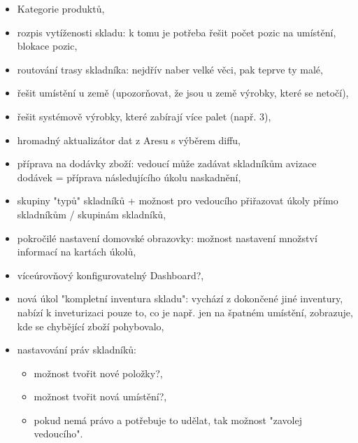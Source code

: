 \begin{itemize}
	\item Kategorie produktů,
	\item rozpis vytíženosti skladu: k tomu je potřeba řešit počet pozic na umístění, blokace pozic,
	\item routování trasy skladníka: nejdřív naber velké věci, pak teprve ty malé,
	\item řešit umístění u země (upozorňovat, že jsou u země výrobky, které se netočí),
	\item řešit systémově výrobky, které zabírají více palet (např. 3),
	\item hromadný aktualizátor dat z Aresu s výběrem diffu,
	\item příprava na dodávky zboží: vedoucí může zadávat skladníkům avizace dodávek = příprava následujícího úkolu naskadnění,
	\item skupiny "typů" skladníků + možnost pro vedoucího přiřazovat úkoly přímo skladníkům / skupinám skladníků,
	\item pokročilé nastavení domovské obrazovky: možnost nastavení množství informací na kartách úkolů,
	\item víceúrovňový konfigurovatelný Dashboard?,
	\item nová úkol "kompletní inventura skladu": vychází z dokončené jiné inventury, nabízí k inveturizaci pouze to, co je např. jen na špatném umístění, zobrazuje, kde se chybějící zboží pohybovalo,
	\item nastavování práv skladníků:
	\begin{itemize}
		\item možnost tvořit nové položky?,
		\item možnost tvořit nová umístění?,
		\item pokud nemá právo a potřebuje to udělat, tak možnost "zavolej vedoucího".
	\end{itemize}
\end{itemize}

